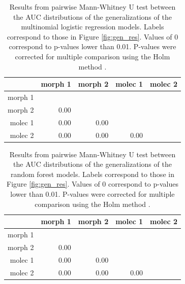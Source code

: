 \documentclass[12pt,letterpaper]{article}\usepackage{graphicx, color}
\begin{document}
\begin{table}
  \centering
\begin{tabular}{r|rrrr}
  & morph 1 & morph 2 & molec 1 & molec 2 \\ 
  \hline
morph 1 &  &  &  &  \\ 
  morph 2 & 0.00 &  &  &  \\ 
  molec 1 & 0.00 & 0.00 &  &  \\ 
  molec 2 & 0.00 & 0.00 & 0.00 &  \\ 
   \hline
\end{tabular}


  \caption{Results from pairwise Mann-Whitney U test between the AUC distributions of the generalizations of the multinomial logistic regression models. Labels correspond to those in Figure \ref{fig:gen_res}. Values of 0 correspond to p-values lower than 0.01. P-values were corrected for multiple comparison using the Holm method \citep{Holm1979}.}
  \label{tab:mm_test}
\end{table}

\begin{table}
  \centering
\begin{tabular}{r|rrrr}
  & morph 1 & morph 2 & molec 1 & molec 2 \\ 
  \hline
morph 1 &  &  &  &  \\ 
  morph 2 & 0.00 &  &  &  \\ 
  molec 1 & 0.00 & 0.00 &  &  \\ 
  molec 2 & 0.00 & 0.00 & 0.00 &  \\ 
   \hline
\end{tabular}


  \caption{Results from pairwise Mann-Whitney U test between the AUC distributions of the generalizations of the random forest models. Labels correspond to those in Figure \ref{fig:gen_res}. Values of 0 correspond to p-values lower than 0.01. P-values were corrected for multiple comparison using the Holm method \citep{Holm1979}.}
  \label{tab:rf_test}
\end{table}
\end{document}
